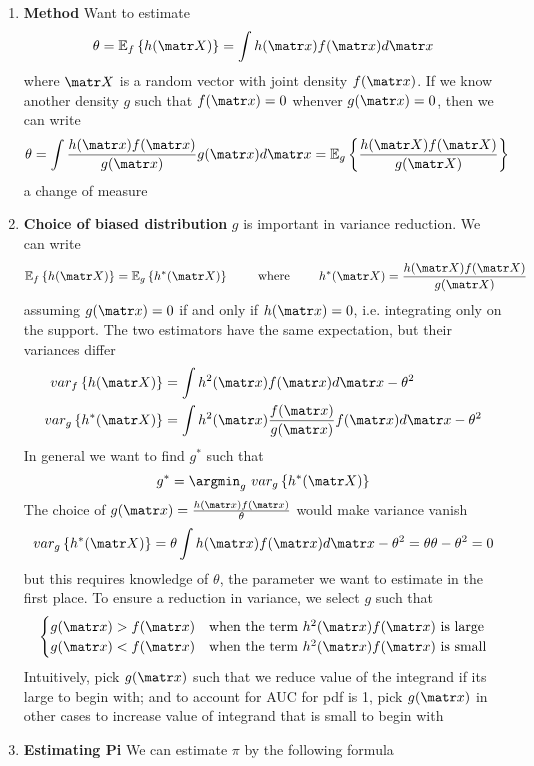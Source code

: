 \documentclass[11pt]{article}
\begin{document}
\begin{enumerate}
\begin{enumerate}
        \item \textbf{Method} Want to estimate 
        \[
            \theta = \E[f]{h(\bX)} = \int h(\bx) f(\bx) d\bx 
        \]
        where $\bX$ is a random vector with joint density $f(\bx)$. If we know another density $g$ such that $f(\bx)=0$ whenver $g(\bx)=0$, then we can write 
        \[
            \theta = \int \frac{h(\bx) f(\bx)}{g(\bx)} g(\bx) d\bx 
            = \E[g]{\frac{h(\bX)f(\bX)}{g(\bX)}}
        \]
        a change of measure
        \item \textbf{Choice of biased distribution} $g$ is important in variance reduction. We can write 
        \[
            \E[f]{h(\bX)} = \E[g]{h^*(\bX)}
            \qquad \text{ where } \qquad 
            h^*(\bX) = \frac{h(\bX)f(\bX)}{g(\bX)}
        \]
        assuming $g(\bx) = 0$ if and only if $h(\bx)=0$, i.e. integrating only on the support. The two estimators have the same expectation, but their variances differ
        \begin{align*}
            \var[f]{h(\bX)} &= \int h^2(\bx) f(\bx) d\bx - \theta^2  \\ 
            \var[g]{h^*(\bX)} &= \int h^2(\bx) \frac{f(\bx)}{g(\bx)} f(\bx) d\bx - \theta^2
        \end{align*}
        In general we want to find $g^*$ such that 
        \[
            g^* = \argmin_g \,\,\var[g]{h^*(\bX)}
        \]
        The choice of $g(\bx) = \textstyle\frac{h(\bx)f(\bx)}{\theta}$ would make variance vanish
        \[
            \var[g]{h^*(\bX)}
            = \theta \int h(\bx) f(\bx) d\bx - \theta^2 
            = \theta \theta - \theta^2 
            = 0
        \]
        but this requires knowledge of $\theta$, the parameter we want to estimate in the first place. To ensure a reduction in variance, we select $g$ such that 
        \[
            \begin{cases}
                g(\bx) > f(\bx) & \text{when the term $h^2(\bx) f(\bx)$ is large} \\ 
                g(\bx) < f(\bx) & \text{when the term $h^2(\bx) f(\bx)$ is small} \\ 
            \end{cases}  
        \]
        Intuitively, pick $g(\bx)$ such that we reduce value of the integrand if its large to begin with; and to account for AUC for pdf is 1, pick $g(\bx)$ in other cases to increase value of integrand that is small to begin with
        \item \textbf{Estimating Pi} We can estimate $\pi$ by the following formula

\end{enumerate}
\end{enumerate}
\end{document}
